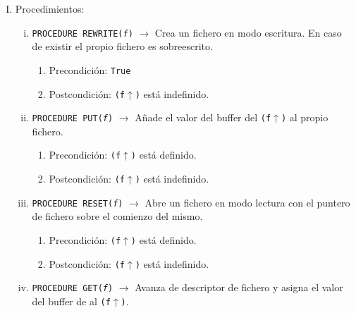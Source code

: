 \begin{enumerate}[I.]
\item {}Procedimientos:

\begin{enumerate}[i.]
\item \texttt{PROCEDURE REWRITE(\textit{f})} $\rightarrow$ Crea un fichero en
modo escritura. En caso de existir el propio fichero es sobreescrito.

\begin{enumerate}

\item Precondición: \texttt{True}

\item Postcondición: \texttt{(f$\uparrow$)} está indefinido.

\end{enumerate}

\item \texttt{PROCEDURE PUT(\textit{f})} $\rightarrow$ Añade el valor del buffer del \texttt{(f$\uparrow$)} al propio fichero.

\begin{enumerate}

\item Precondición: \texttt{(f$\uparrow$)} está definido.

\item Postcondición: \texttt{(f$\uparrow$)} está indefinido.

\end{enumerate}

\item \texttt{PROCEDURE RESET(\textit{f})} $\rightarrow$ Abre un fichero en modo
lectura con el puntero de fichero sobre el comienzo del mismo.

\begin{enumerate}

\item Precondición: \texttt{(f$\uparrow$)} está definido.

\item Postcondición: \texttt{(f$\uparrow$)} está indefinido.

\end{enumerate}

\item \texttt{PROCEDURE GET(\textit{f})} $\rightarrow$ Avanza de descriptor de fichero y asigna el valor del buffer de al \texttt{(f$\uparrow$)}.

\begin{enumerate}


\end{enumerate}
\end{enumerate}
\end{enumerate}
